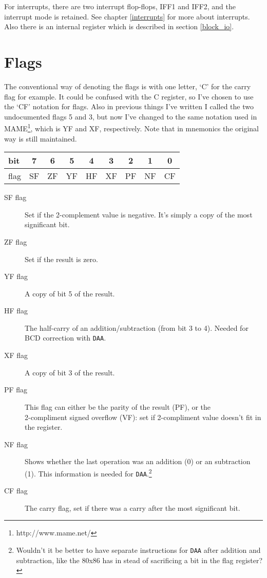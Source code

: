 \documentclass[oneside,a4paper]{book}
\newcommand{\instrt}{\rule{0pt}{2.7ex}}
\newcommand{\instrb}{\rule[-1.7ex]{0pt}{0pt}}
\begin{document}
For interrupts, there are two interrupt flop-flops, IFF1 and IFF2, and the interrupt mode is retained. See chapter \ref{interrupts} for more about interrupts. Also there is an internal register which is described in section \ref{block_io}.


\section{Flags}
\label{flags}

The conventional way of denoting the flags is with one letter, `C' for the carry flag for example. It could be confused with the C register, so I've chosen to use the `CF' notation for flags. Also in previous things I've written I called the two undocumented flags 5 and 3, but now I've changed to the same notation used in MAME\footnote{http://www.mame.net/}, which is YF and XF, respectively. Note that in mnemonics the original way is still maintained.

\begin{tabular}{|l|c|c|c|c|c|c|c|c|} 
	\hline
	bit & 7 & 6 & 5 & 4 & 3 & 2 & 1 & 0 \instrt\instrb \\
	\hline
	flag & SF & ZF & YF & HF & XF & PF & NF & CF \instrt\instrb \\ 
	\hline
\end{tabular}

\begin{description}

	\item[SF flag]
	Set if the 2-complement value is negative. It's simply a copy of the most significant bit.

	\item[ZF flag]
	Set if the result is zero.

	\item[YF flag]
	A copy of bit 5 of the result.

	\item[HF flag]
	The half-carry of an addition/subtraction (from bit 3 to 4). Needed for BCD correction with {\tt DAA}.

	\item[XF flag]
	A copy of bit 3 of the result.

	\item[PF flag]
	This flag can either be the parity of the result (PF), or the \\ 2-compliment signed overflow (VF): set if 2-compliment value doesn't fit in the register.

	\item[NF flag]
	Shows whether the last operation was an addition (0) or an subtraction (1). This information is needed for {\tt DAA}.\footnote{Wouldn't it be better to have separate instructions for {\tt DAA} after addition and subtraction, like the 80x86 has in stead of sacrificing a bit in the flag register?}

	\item[CF flag]
	The carry flag, set if there was a carry after the most significant bit.

\end{description}
\end{document}
